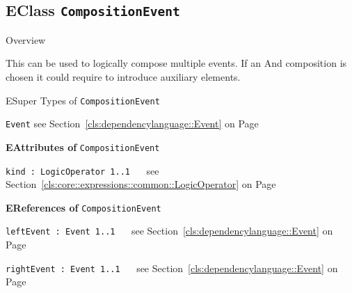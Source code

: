 \subsection{EClass \bfseries \texttt{CompositionEvent}\normalfont}
\label{cls:dependencylanguage::CompositionEvent} 
	
	\begin{longdescription}
		\item[Overview] 		
				

	

		This can be used to logically compose multiple events.
If an And composition is chosen it could require to introduce auxiliary elements.		
		\item[ESuper Types of \texttt{CompositionEvent}] ~
			\begin{longdescription}
				\item[\texttt{Event}] see Section~\ref{cls:dependencylanguage::Event} on Page~\pageref{cls:dependencylanguage::Event}						\end{longdescription}
		
	
			\item[\textbf{EAttributes of} \texttt{CompositionEvent}] ~
			\begin{longdescription}
	\item[\texttt{kind : LogicOperator \symbol{"5B}1..1\symbol{"5D}
}] ~
	see Section~\ref{cls:core::expressions::common::LogicOperator} on Page~\pageref{cls:core::expressions::common::LogicOperator}
	
	\nopagebreak
		
				

	

	
			\end{longdescription}
			\item[\textbf{EReferences of} \texttt{CompositionEvent}] ~
			\begin{longdescription}
	\item[\texttt{leftEvent : Event \symbol{"5B}1..1\symbol{"5D}
}] ~
	see Section~\ref{cls:dependencylanguage::Event} on Page~\pageref{cls:dependencylanguage::Event}
	
	\nopagebreak
		
				

	

	
	\item[\texttt{rightEvent : Event \symbol{"5B}1..1\symbol{"5D}
}] ~
	see Section~\ref{cls:dependencylanguage::Event} on Page~\pageref{cls:dependencylanguage::Event}
	
	\nopagebreak
		
				

	

	
			\end{longdescription}
	
	\end{longdescription}
	

